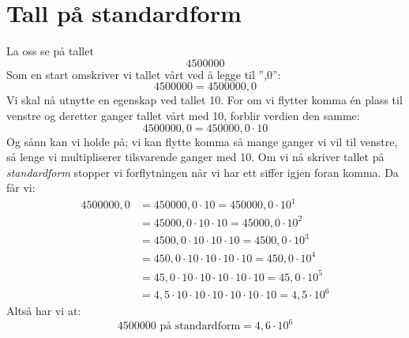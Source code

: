 \section{Tall på standardform}
La oss se på tallet 
\[ 4500000 \]
\qquad
{}
Som en start omskriver vi tallet vårt ved å legge til '',0'':
\[
4500000=4500000,0
\]
Vi skal nå utnytte en egenskap ved tallet 10. For om vi flytter komma én plass til venstre og deretter ganger tallet
vårt med 10, forblir verdien den samme:
\[ 4500000,0=450000,0\cdot10 \]
Og sånn kan vi holde på; vi kan flytte komma så mange ganger vi vil
til venstre, så lenge vi multipliserer tilsvarende ganger med 10.
Om vi nå skriver tallet på \textit{standardform} stopper vi forflytningen når vi har ett siffer igjen foran komma. Da får vi: 
\begin{align*}
4500000,0 & =450000,0\cdot10=450000,0\cdot10^{1}\\
 & =45000,0\cdot10\cdot10=45000,0\cdot10^{2}\\
 & =4500,0\cdot10\cdot10\cdot10=4500,0\cdot10^{3}\\
 & =450,0\cdot10\cdot10\cdot10\cdot10=450,0\cdot10^{4}\\
 & =45,0\cdot10\cdot10\cdot10\cdot10\cdot10=45,0\cdot10^{5}\\
 & =4,5\cdot10\cdot10\cdot10\cdot10\cdot10\cdot10=4,5\cdot10^{6}
\end{align*}
Altså har vi at:
\[ \text{4500000 på standardform}=4,6\cdot10^6 \] \vsk

